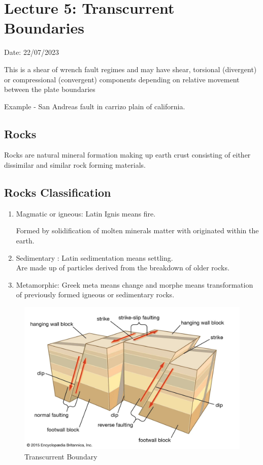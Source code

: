 \documentclass{article}
\begin{document}
\section{Lecture 5: Transcurrent Boundaries}
\hfill Date: 22/07/2023 
   
\begin{multicols}{2}
  This is a shear of wrench fault regimes and may have shear, torsional (divergent) or compressional (convergent) components depending on relative movement between the plate boundaries
  

  Example - San Andreas fault in carrizo plain of california.

  \subsection*{Rocks}
  Rocks are natural mineral formation making up earth crust consisting of either dissimilar and similar rock forming materials. 

  \subsection*{Rocks Classification}
  \begin{enumerate}
    \item Magmatic or igneous: Latin Ignis means fire. 
    
    Formed by solidification of molten minerals matter with originated within the earth.
    \item Sedimentary : Latin sedimentation means settling. \\Are made up of particles derived from the breakdown of older rocks. 
    \item Metamorphic: Greek meta means change and morphe means transformation of previously formed igneous or sedimentary rocks.
  \end{enumerate}
\end{multicols}

  \begin{figure}[H]
    \centering 
    \includegraphics*[width=0.6\linewidth]{img/transcurrent_boundary.jpg}
    \caption{Transcurrent Boundary}
  \end{figure}
\end{document}
